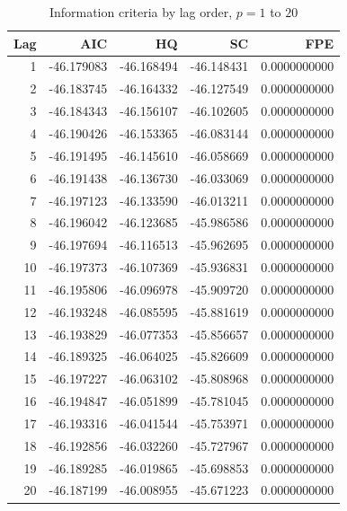 \begin{table}[ht]
\centering
\caption{Information criteria by lag order, $p = 1$ to $20$} 
\label{tab:lag_criteria_full}
\begin{tabular}{rrrrr}
  \toprule
Lag & AIC & HQ & SC & FPE \\ 
  \midrule
1 & -46.179083 & -46.168494 & -46.148431 & 0.0000000000 \\ 
  2 & -46.183745 & -46.164332 & -46.127549 & 0.0000000000 \\ 
  3 & -46.184343 & -46.156107 & -46.102605 & 0.0000000000 \\ 
  4 & -46.190426 & -46.153365 & -46.083144 & 0.0000000000 \\ 
  5 & -46.191495 & -46.145610 & -46.058669 & 0.0000000000 \\ 
  6 & -46.191438 & -46.136730 & -46.033069 & 0.0000000000 \\ 
  7 & -46.197123 & -46.133590 & -46.013211 & 0.0000000000 \\ 
  8 & -46.196042 & -46.123685 & -45.986586 & 0.0000000000 \\ 
  9 & -46.197694 & -46.116513 & -45.962695 & 0.0000000000 \\ 
  10 & -46.197373 & -46.107369 & -45.936831 & 0.0000000000 \\ 
  11 & -46.195806 & -46.096978 & -45.909720 & 0.0000000000 \\ 
  12 & -46.193248 & -46.085595 & -45.881619 & 0.0000000000 \\ 
  13 & -46.193829 & -46.077353 & -45.856657 & 0.0000000000 \\ 
  14 & -46.189325 & -46.064025 & -45.826609 & 0.0000000000 \\ 
  15 & -46.197227 & -46.063102 & -45.808968 & 0.0000000000 \\ 
  16 & -46.194847 & -46.051899 & -45.781045 & 0.0000000000 \\ 
  17 & -46.193316 & -46.041544 & -45.753971 & 0.0000000000 \\ 
  18 & -46.192856 & -46.032260 & -45.727967 & 0.0000000000 \\ 
  19 & -46.189285 & -46.019865 & -45.698853 & 0.0000000000 \\ 
  20 & -46.187199 & -46.008955 & -45.671223 & 0.0000000000 \\ 
   \bottomrule
\end{tabular}
\end{table}

